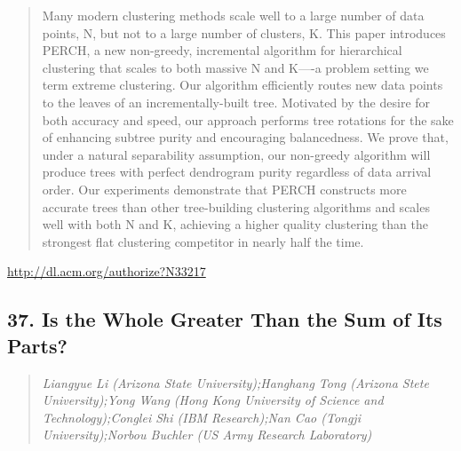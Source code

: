 \documentclass{article}
\begin{document}
\begin{quote}
Many modern clustering methods scale well to a large number of data points, N, but not to a large number of clusters, K. This paper introduces PERCH, a new non-greedy, incremental algorithm for hierarchical clustering that scales to both massive N and K—-a problem setting we term extreme clustering. Our algorithm efficiently routes new data points to the leaves of an incrementally-built tree. Motivated by the desire for both accuracy and speed, our approach performs tree rotations for the sake of enhancing subtree purity and encouraging balancedness. We prove that, under a natural separability assumption, our non-greedy algorithm will produce trees with perfect dendrogram purity regardless of data arrival order. Our experiments demonstrate that PERCH constructs more accurate trees than other tree-building clustering algorithms and scales well with both N and K, achieving a higher quality clustering than the strongest flat clustering competitor in nearly half the time.
\end{quote}

\href{http://dl.acm.org/authorize?N33217}{http://dl.acm.org/authorize?N33217}

\subsection{37. Is the Whole Greater Than the Sum of Its Parts?}

\begin{quote}
\footnotesize{\textit{Liangyue Li (Arizona State University);Hanghang Tong (Arizona Stete University);Yong Wang (Hong Kong University of Science and Technology);Conglei Shi (IBM Research);Nan Cao (Tongji University);Norbou Buchler (US Army Research Laboratory)}}

\end{quote}
\end{document}
